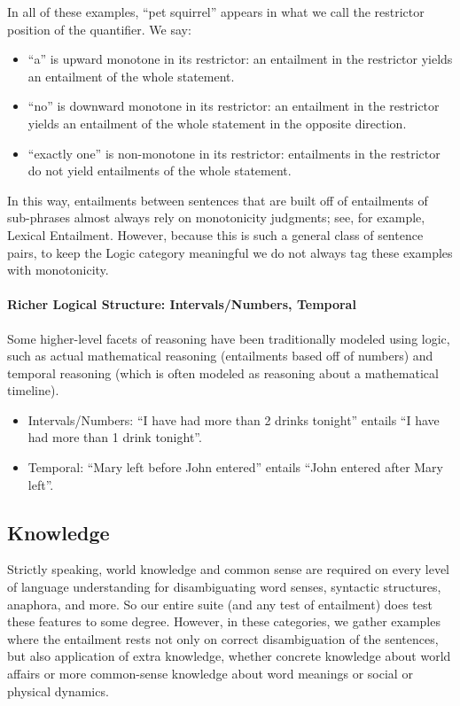\documentclass{article} \usepackage{iclr2019_conference,times}
\begin{document}
In all of these examples, ``pet squirrel'' appears in what we call the restrictor position of the quantifier. We say:
\begin{itemize}
    \item ``a'' is upward monotone in its restrictor: an entailment in the restrictor yields an entailment of the whole statement.
    \item ``no'' is downward monotone in its restrictor: an entailment in the restrictor yields an entailment of the whole statement in the opposite direction.
    \item ``exactly one'' is non-monotone in its restrictor: entailments in the restrictor do not yield entailments of the whole statement.
\end{itemize}
In this way, entailments between sentences that are built off of entailments of sub-phrases almost always rely on monotonicity judgments; see, for example, Lexical Entailment. However, because this is such a general class of sentence pairs, to keep the Logic category meaningful we do not always tag these examples with monotonicity.


\paragraph{Richer Logical Structure: Intervals/Numbers, Temporal}

Some higher-level facets of reasoning have been traditionally modeled using logic, such as actual mathematical reasoning (entailments based off of numbers) and temporal reasoning (which is often modeled as reasoning about a mathematical timeline).
\begin{itemize}
    \item Intervals/Numbers: ``I have had more than 2 drinks tonight'' entails ``I have had more than 1 drink tonight''.
    \item Temporal: ``Mary left before John entered'' entails ``John entered after Mary left''.
\end{itemize}

\subsection{Knowledge}

Strictly speaking, world knowledge and common sense are required on every level of language understanding for disambiguating word senses, syntactic structures, anaphora, and more. So our entire suite (and any test of entailment) does test these features to some degree. However, in these categories, we gather examples where the entailment rests not only on correct disambiguation of the sentences, but also application of extra knowledge, whether concrete knowledge about world affairs or more common-sense knowledge about word meanings or social or physical dynamics.
\end{document}
